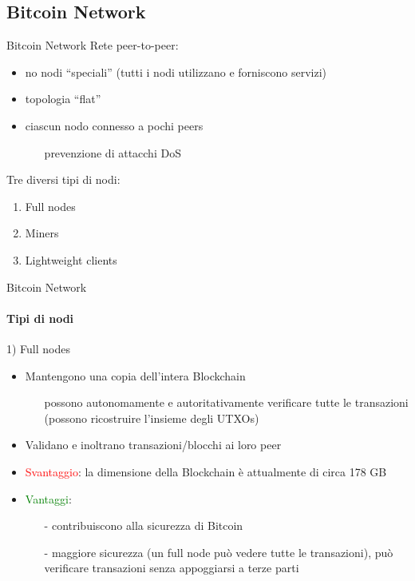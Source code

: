 \documentclass{beamer}
\begin{document}
  \subsection{Bitcoin Network}
  \begin{frame}{Bitcoin Network}
    Rete peer-to-peer:
    \begin{itemize}
        \item no nodi ``speciali'' (tutti i nodi utilizzano e forniscono servizi) 
        \item topologia ``flat''
        \item ciascun nodo connesso a pochi peers
        \begin{itemize}
            \item[\MVRightarrow] prevenzione di attacchi DoS  %
        \end{itemize}
    \end{itemize}
    
    Tre diversi tipi di nodi:
    \begin{enumerate}
        \item Full nodes
        \item Miners
        \item Lightweight clients
    \end{enumerate}
    
  \end{frame}
  
  
  
  
  \begin{frame}{Bitcoin Network}
    \framesubtitle{Tipi di nodi}
    \begin{block}{1) Full nodes}
        \begin{itemize}
            \item Mantengono una copia dell'intera Blockchain
            \begin{itemize}
                \item[\MVRightarrow] possono autonomamente e autoritativamente verificare tutte le transazioni (possono ricostruire l'insieme degli UTXOs)
            \end{itemize}
            \item Validano e inoltrano transazioni/blocchi ai loro peer
            \item \textcolor{red}{Svantaggio}: la dimensione della Blockchain è attualmente di circa 178 GB \cite{statista}
            \item \textcolor{green}{Vantaggi}: 
            \begin{itemize}
                \item[-] contribuiscono alla sicurezza di Bitcoin
                \item[-] maggiore sicurezza (un full node può vedere tutte le transazioni), può verificare transazioni senza appoggiarsi a terze parti
            \end{itemize}
        \end{itemize}
    \end{block}
  \end{frame}
  
\end{document}
